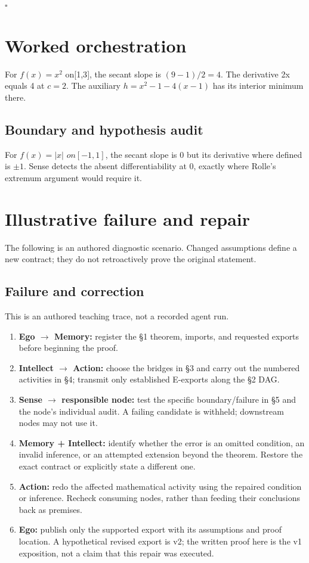 \documentclass[preprint,12pt,aps,pra,showkeys,amsmath,amssymb,superscriptaddress,floatfix]{revtex4-2}
\theoremstyle{definition}
\theoremstyle{remark}
\providecommand{\tightlist}{\setlength{\itemsep}{2pt}\setlength{\parskip}{0pt}}
\begin{document}
\hfill$\square$

\section{Worked orchestration}

For \(f(x)=x^{2}\) on{[}1,3{]}, the secant slope is \((9-1)/2=4\). The
derivative 2x equals 4 at \(c=2\). The auxiliary \(h=x^{2}-1-4(x-1)\)
has its interior minimum there.

\subsection{Boundary and hypothesis audit}

For \(f(x)=|x|\) \(on[-1,1]\), the secant slope is 0 but its derivative
where defined is \(\pm 1\). Sense detects the absent differentiability
at 0, exactly where Rolle's extremum argument would require it.

\section{Illustrative failure and repair}

The following is an authored diagnostic scenario. Changed assumptions
define a new contract; they do not retroactively prove the original
statement.

\subsection{Failure and correction}
This is an authored teaching trace, not a recorded agent run.

\begin{enumerate}
\def\labelenumi{\arabic{enumi}.}
\tightlist
\item
  \textbf{Ego \(\to\) Memory:} register the §1 theorem, imports, and
  requested exports before beginning the proof.
\item
  \textbf{Intellect \(\to\) Action:} choose the bridges in §3 and carry
  out the numbered activities in §4; transmit only established E-exports
  along the §2 DAG.
\item
  \textbf{Sense \(\to\) responsible node:} test the specific
  boundary/failure in §5 and the node's individual audit. A failing
  candidate is withheld; downstream nodes may not use it.
\item
  \textbf{Memory + Intellect:} identify whether the error is an omitted
  condition, an invalid inference, or an attempted extension beyond the
  theorem. Restore the exact contract or explicitly state a different
  one.
\item
  \textbf{Action:} redo the affected mathematical activity using the
  repaired condition or inference. Recheck consuming nodes, rather than
  feeding their conclusions back as premises.
\item
  \textbf{Ego:} publish only the supported export with its assumptions
  and proof location. A hypothetical revised export is v2; the written
  proof here is the v1 exposition, not a claim that this repair was
  executed.
\end{enumerate}
\end{document}
